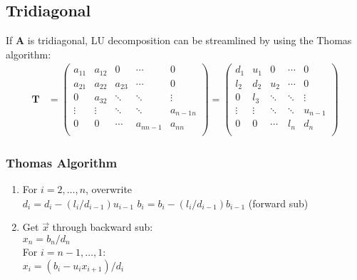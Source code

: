 \documentclass[12pt]{article}
\newcommand{\ve}[1]{\ensuremath{\mathbf{#1}}}
\begin{document}
\subsection*{Tridiagonal}
If $\ve{A}$ is tridiagonal, LU decomposition can be streamlined by using the Thomas algorithm:
%
\begin{align}
    \ve{T} &= \begin{pmatrix}
      a_{11} & a_{12} & 0      & \cdots    & 0 \\
      a_{21} & a_{22} & a_{23} & \cdots    & 0 \\
      0      & a_{32} & \ddots & \ddots    & \vdots \\     
      \vdots & \vdots & \ddots & \ddots    & a_{n-1 n}\\
      0      & 0      & \cdots & a_{n n-1} & a_{nn} \\
    \end{pmatrix} =
    \begin{pmatrix}
      d_{1}  & u_{1}  & 0      & \cdots & 0 \\
      l_{2}  & d_{2}  & u_{2}  & \cdots & 0 \\
      0      & l_{3}  & \ddots & \ddots & \vdots \\     
      \vdots & \vdots & \ddots & \ddots & u_{n-1}\\
      0      & 0      & \cdots & l_{n}  & d_{n} \\
    \end{pmatrix} \nonumber   
\end{align} 

\subsubsection*{Thomas Algorithm}
\begin{enumerate}
\item For $i=2, \dots, n$, overwrite\\
  \hspace*{1 em} $d_i = d_i - (l_i / d_{i-1}) u_{i-1}$
  \hspace*{1 em} $b_i = b_i - (l_i / d_{i-1}) b_{i-1}$ (forward sub)

\item Get $\vec{x}$ through backward sub:\\
$x_n = b_n / d_n$\\
For $i = n-1, \dots, 1$:\\
  \hspace*{1 em} $x_i = (b_i - u_i x_{i+1}) / d_i$
\end{enumerate}



 
\end{document}
